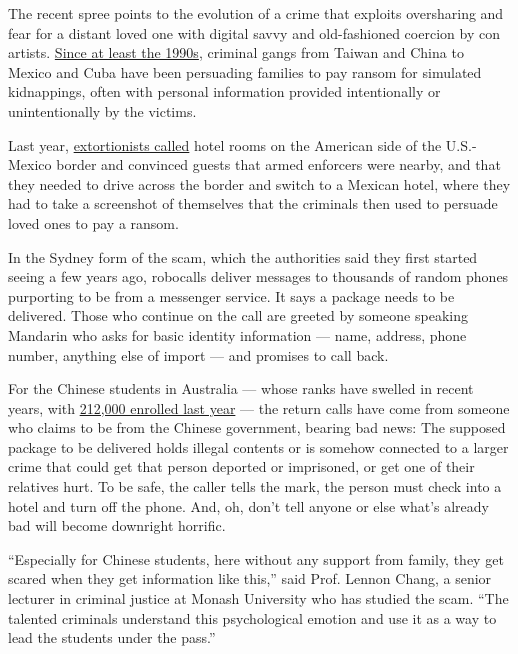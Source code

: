 The recent spree points to the evolution of a crime that exploits
oversharing and fear for a distant loved one with digital savvy and
old-fashioned coercion by con artists.
\href{https://theconversation.com/new-virtual-kidnapping-scam-targeting-chinese-students-makes-use-of-data-shared-online-96910}{Since
at least the 1990s}, criminal gangs from Taiwan and China to Mexico and
Cuba have been persuading families to pay ransom for simulated
kidnappings, often with personal information provided intentionally or
unintentionally by the victims.

Last year,
\href{https://www.fbi.gov/contact-us/field-offices/phoenix/news/press-releases/fbi-law-enforcement-partners-warn-of-new-twist-in-virtual-kidnapping-scams}{extortionists
called} hotel rooms on the American side of the U.S.-Mexico border and
convinced guests that armed enforcers were nearby, and that they needed
to drive across the border and switch to a Mexican hotel, where they had
to take a screenshot of themselves that the criminals then used to
persuade loved ones to pay a ransom.

In the Sydney form of the scam, which the authorities said they first
started seeing a few years ago, robocalls deliver messages to thousands
of random phones purporting to be from a messenger service. It says a
package needs to be delivered. Those who continue on the call are
greeted by someone speaking Mandarin who asks for basic identity
information --- name, address, phone number, anything else of import ---
and promises to call back.

For the Chinese students in Australia --- whose ranks have swelled in
recent years, with
\href{https://internationaleducation.gov.au/research/DataVisualisations/Pages/Student-number.aspx}{212,000
enrolled last year} --- the return calls have come from someone who
claims to be from the Chinese government, bearing bad news: The supposed
package to be delivered holds illegal contents or is somehow connected
to a larger crime that could get that person deported or imprisoned, or
get one of their relatives hurt. To be safe, the caller tells the mark,
the person must check into a hotel and turn off the phone. And, oh,
don't tell anyone or else what's already bad will become downright
horrific.

``Especially for Chinese students, here without any support from family,
they get scared when they get information like this,'' said Prof. Lennon
Chang, a senior lecturer in criminal justice at Monash University who
has studied the scam. ``The talented criminals understand this
psychological emotion and use it as a way to lead the students under the
pass.''

